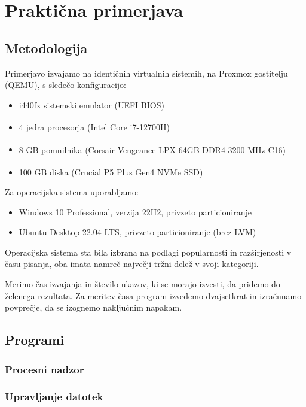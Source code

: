 \documentclass[a4paper,12pt,openright]{book}
\begin{document}
\chapter{Praktična primerjava}

\section{Metodologija}

Primerjavo izvajamo na identičnih virtualnih sistemih, na Proxmox gostitelju (QEMU), s sledečo konfiguracijo:
\begin{itemize}
	\item i440fx sistemski emulator (UEFI BIOS)
	\item 4 jedra procesorja (Intel\textsuperscript{\textregistered} Core\textsuperscript{\texttrademark} i7-12700H)
	\item 8 GB pomnilnika (Corsair\textsuperscript{\textregistered} Vengeance\textsuperscript{\textregistered} LPX 64GB DDR4 3200 MHz C16)
	\item 100 GB diska (Crucial\textsuperscript{\textregistered} P5 Plus Gen4 NVMe SSD)
\end{itemize}

Za operacijska sistema uporabljamo:
\begin{itemize}
	\item Windows 10 Professional, verzija 22H2, privzeto particioniranje
	\item Ubuntu Desktop 22.04 LTS, privzeto particioniranje (brez LVM)
\end{itemize}
Operacijska sistema sta bila izbrana na podlagi popularnosti in razširjenosti v času pisanja, oba imata namreč največji tržni delež v svoji kategoriji.

Merimo čas izvajanja in število ukazov, ki se morajo izvesti, da pridemo do želenega rezultata.
Za meritev časa program izvedemo dvajsetkrat in izračunamo povprečje, da se izognemo naključnim napakam.

\section{Programi}

\subsection{Procesni nadzor}

\subsection{Upravljanje datotek}
\end{document}
